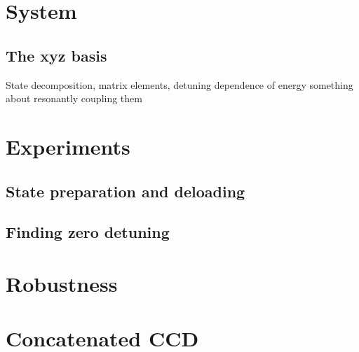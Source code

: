 

\section{System}
\subsection{The xyz basis}
State decomposition, matrix elements, detuning dependence of energy something about resonantly coupling them

\section{Experiments}
\subsection{State preparation and deloading}
\subsection{Finding zero detuning}


\section{Robustness}

\section{Concatenated CCD}




